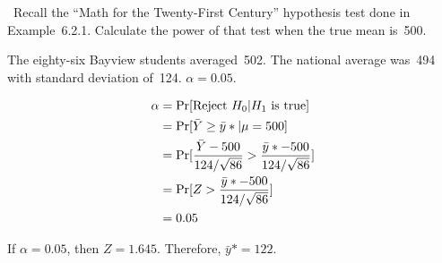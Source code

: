 \begin{problem}
  ~Recall the ``Math for the Twenty-First Century'' hypothesis test done in Example~6.2.1. Calculate the power of that test when the true mean is~500.
\end{problem}

The eighty-six Bayview students averaged~502.  The national average was~494 with standard deviation of~124. ${\alpha = 0.05}$.

\begin{align*}
  \alpha &= \Pr\lbrack\text{Reject } H_0 \vert H_1 \text{ is true}\rbrack \\
         &= \Pr\lbrack\bar{Y} \geq \bar{y}* \vert \mu = 500\rbrack \\
         &= \Pr\lbrack\frac{\bar{Y} - 500}{124 /\sqrt{86}} > \frac{\bar{y}* - 500}{124 /\sqrt{86}}\rbrack \\
         &= \Pr\lbrack Z > \frac{\bar{y}* - 500}{124 /\sqrt{86}}\rbrack \\
         &= 0.05
\end{align*}

\noindent
If ${\alpha = 0.05}$, then ${Z = 1.645}$. Therefore, ${\bar{y}* = 122}$.
